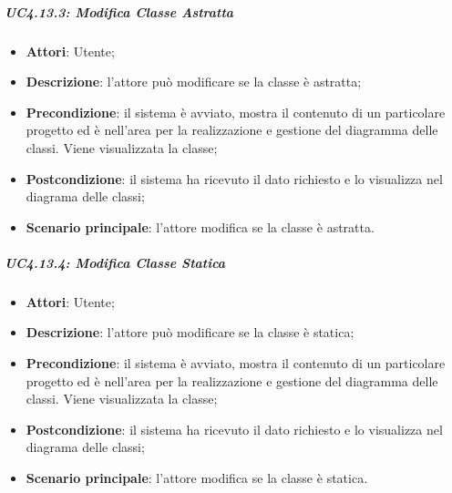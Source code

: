 \subparagraph{UC4.13.3: Modifica Classe Astratta}
\label{UC4.13.3}
\begin{itemize}
	\item \textbf{Attori}: Utente;
	\item \textbf{Descrizione}: l'attore può modificare se la classe è astratta;
	\item \textbf{Precondizione}: il sistema è avviato, mostra il contenuto di un particolare progetto ed è nell'area per la realizzazione e gestione del diagramma delle classi. Viene visualizzata la classe;
	\item \textbf{Postcondizione}: il sistema ha ricevuto il dato richiesto e lo visualizza nel diagrama delle classi;
	\item \textbf{Scenario principale}: l'attore modifica se la classe è astratta.
\end{itemize}

\subparagraph{UC4.13.4: Modifica Classe Statica}
\label{UC4.13.4}
\begin{itemize}
	\item \textbf{Attori}: Utente;
	\item \textbf{Descrizione}: l'attore può modificare se  la classe è statica;
	\item \textbf{Precondizione}: il sistema è avviato, mostra il contenuto di un particolare progetto ed è nell'area per la realizzazione e gestione del diagramma delle classi. Viene visualizzata la classe;
	\item \textbf{Postcondizione}: il sistema ha ricevuto il dato richiesto e lo visualizza nel diagrama delle classi;
	\item \textbf{Scenario principale}: l'attore modifica se la classe è statica.
\end{itemize}

